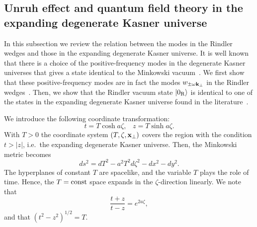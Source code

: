 \documentclass[12pt,nofootinbib,floatfix,aps,prd,showpacs,amsmath,amssymb,eqsecnum]{revtex4-2}
\let\cite\citep
\begin{document}
\subsection{Unruh effect and quantum field theory in the expanding 
degenerate Kasner universe}
\label{section2:Milne} 

In this subsection 
we review the relation between the modes in the Rindler
wedges and those in 
the expanding degenerate Kasner universe.  It is
well known that there is a choice of the positive-frequency modes in the
degenerate Kasner universes that
gives a state identical to the Minkowski
vacuum~\cite{Fullingetal74}.  We first show that
these positive-frequency modes are in fact the modes $w_{\pm
\omega{\bf k}_\bot}$ in the Rindler wedges~\cite{Gerlach88}.  Then, we
show that the Rindler vacuum state $|0_{\rm R}\rangle$ is identical to
one of the states in the expanding
degenerate Kasner universe found in the 
literature~\cite{Birrelletal82,Fullingetal74}. 

We introduce the following coordinate transformation:
\begin{equation}
t  =  T\cosh a\zeta, \;\;\;
z  =  T\sinh a\zeta.
\end{equation}
With $T>0$ the coordinate system $(T,\zeta,{\bf x}_\bot)$ covers the
region with the condition $t > |z|$, i.e.~the expanding degenerate Kasner
universe. Then, the Minkowski metric becomes
\begin{equation}
ds^2 = dT^2 - a^2 T^2d\zeta^2 - dx^2 - dy^2.
\end{equation}
The hyperplanes 
of constant $T$ are spacelike, and the variable $T$ plays the
role of time.
Hence, the $T= {\rm const}$ space expands in the $\zeta$-direction
linearly. We note that
\begin{equation}
\frac{t+z}{t-z} = e^{2a\zeta}, \label{sec2:2azeta}
\end{equation}
and that $(t^2-z^2)^{1/2}=T$.
\end{document}
